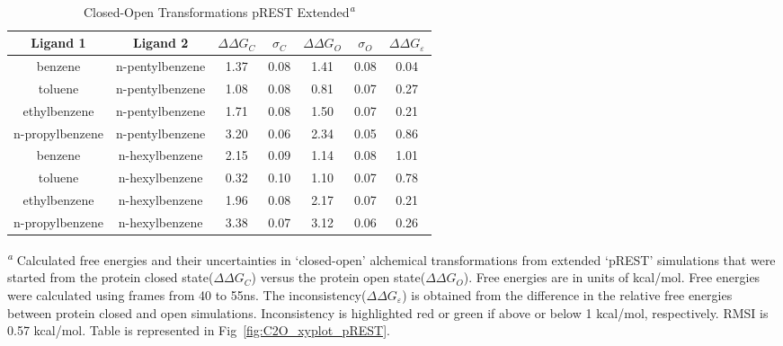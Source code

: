 \begin{table}[!htb]
\centering
\caption{Closed-Open Transformations pREST Extended\textsuperscript{\emph{a}}}
\label{tbl:C-O_pREST-40-55ns}
\begin{tabular}{|c|c|c|c|c|c|c|}
\hline
\textbf{Ligand 1}       & \textbf{Ligand 2}    & \boldmath$\Delta\Delta G_{C}$ & \boldmath$\sigma_{C}$ & \boldmath$\Delta\Delta G_{O}$ & \boldmath$\sigma_{O}$ & \boldmath$\Delta\Delta G_{\varepsilon}$ \\ \hline
benzene         & n-pentylbenzene & 1.37       & 0.08     & 1.41    & 0.08      & \cellcolor[HTML]{9AFF99}0.04 \\ \hline
toluene         & n-pentylbenzene & 1.08       & 0.08     & 0.81    & 0.07      & \cellcolor[HTML]{9AFF99}0.27 \\ \hline
ethylbenzene    & n-pentylbenzene & 1.71       & 0.08     & 1.50    & 0.07      & \cellcolor[HTML]{9AFF99}0.21 \\ \hline
n-propylbenzene & n-pentylbenzene & 3.20       & 0.06     & 2.34    & 0.05      & \cellcolor[HTML]{9AFF99}0.86 \\ \hline
benzene         & n-hexylbenzene  & 2.15       & 0.09     & 1.14    & 0.08      & \cellcolor[HTML]{FFCCC9}1.01 \\ \hline
toluene         & n-hexylbenzene  & 0.32       & 0.10     & 1.10    & 0.07      & \cellcolor[HTML]{9AFF99}0.78 \\ \hline
ethylbenzene    & n-hexylbenzene  & 1.96       & 0.08     & 2.17    & 0.07      & \cellcolor[HTML]{9AFF99}0.21 \\ \hline
n-propylbenzene & n-hexylbenzene  & 3.38       & 0.07     & 3.12    & 0.06      & \cellcolor[HTML]{9AFF99}0.26 \\ \hline
\end{tabular}

\textsuperscript{\emph{a}} Calculated free energies and their uncertainties in `closed-open' alchemical transformations from extended `pREST' simulations that were started from the protein closed state(\boldmath$\Delta\Delta G_{C}$) versus the protein open state(\boldmath$\Delta\Delta G_{O}$). 
Free energies are in units of kcal/mol.
Free energies were calculated using frames from 40 to 55ns. 
The inconsistency(\boldmath$\Delta\Delta G_{\varepsilon}$) is obtained from the difference in the relative free energies between protein closed and open simulations. 
Inconsistency is highlighted red or green if above or below 1 kcal/mol, respectively.
RMSI is 0.57 kcal/mol.
Table is represented in Fig~\ref{fig:C2O_xyplot_pREST}.
\end{table}


